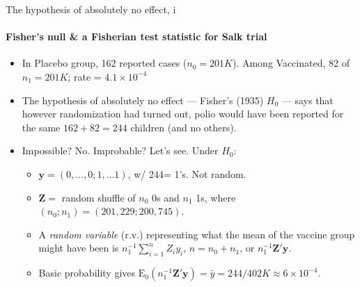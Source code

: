 \begin{frame}{The hypothesis of absolutely no effect,  i}
\framesubtitle{Fisher's null \& a Fisherian test statistic for Salk trial}
  \begin{itemize}
  \item In Placebo group, 162 reported cases ($n_{0}=201K$).  Among
    Vaccinated, 82 of $n_{1}=201K$; rate = $4.1\times 10^{-4}$ 
   \item The hypothesis of absolutely no effect --- Fisher's (1935) $H_{0}$ --- says that however
     randomization had turned out, polio would have
     been reported for the same $162 +
     82 = 244$ children (and no others).
   \item Impossible?  No.  Improbable?  Let's see.  Under $H_{0}$:
     \begin{itemize}
     \item $\mathbf{y} = (0, \ldots, 0; 1, \ldots 1)$, w/ 244= 1's.
       Not random. 
     \item $\mathbf{Z} =$ random shuffle of $n_{0}$ 0s and $n_{1}$
      1s, where $(n_{0}; n_{1}) = (201,229 ; 200,745)$.  
     \item A \textit{random variable}  (r.v.) representing what the mean of
       the vaccine group might have been is 
       $n_{1}^{-1}\sum_{i=1}^{n} Z_{i}y_{i}$, $n = n_{0} + n_{1}$, or
       $n_{1}^{-1}\mathbf{Z}'\mathbf{y}$.
     \item Basic probability gives
       $\mathrm{E}_{0}(n_{1}^{-1}\mathbf{Z}'\mathbf{y}) = \bar y =
       244/402K \approx 6\times 10^{-4}$. 
     \end{itemize}
  \end{itemize}
  \end{frame}

